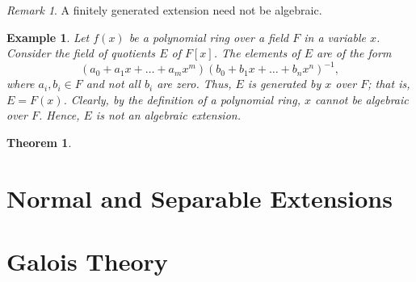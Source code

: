 \documentclass[draft]{article}
\newtheorem{thm}{Theorem}[section]
\newtheorem{exmp}{Example}
\theoremstyle{definition}
\theoremstyle{remark}
\newtheorem{rem}{Remark}[section]
\begin{document}
            \begin{rem}
                A finitely generated extension need not be algebraic.
            \end{rem}
            
             \begin{exmp}
                Let $f(x)$ be a polynomial ring over a field $F$ in a variable $x$. Consider the field of quotients $E$ of $F[x]$. The elements of $E$ are of the form
                \begin{equation*}
                    (a_0 + a_1x + \dots + a_mx^m)(b_0 + b_1x + \dots + b_nx^n)^{-1},
                \end{equation*}
                where $a_i, b_i \in F$ and not all $b_i$ are zero. Thus, $E$ is generated by $x$ over $F$; that is, $E = F(x)$. Clearly, by the definition of a polynomial ring, $x$ cannot be algebraic over $F$. Hence, $E$ is not an algebraic extension.
            \end{exmp}
            
            \begin{thm}
                
            \end{thm}
            
	\section{Normal and Separable Extensions}
	
	\section{Galois Theory}
	
\newpage

    \begin{thebibliography}{10}
    
    	\bibitem{}
    	
    \end{thebibliography}
	
\end{document}
